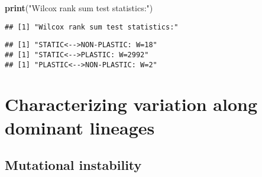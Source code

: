 \documentclass[]{book}
\newenvironment{Shaded}{\begin{snugshade}}{\end{snugshade}}
\newcommand{\ControlFlowTok}[1]{\textcolor[rgb]{0.13,0.29,0.53}{\textbf{#1}}}
\newcommand{\DataTypeTok}[1]{\textcolor[rgb]{0.13,0.29,0.53}{#1}}
\newcommand{\DecValTok}[1]{\textcolor[rgb]{0.00,0.00,0.81}{#1}}
\newcommand{\KeywordTok}[1]{\textcolor[rgb]{0.13,0.29,0.53}{\textbf{#1}}}
\newcommand{\NormalTok}[1]{#1}
\newcommand{\OperatorTok}[1]{\textcolor[rgb]{0.81,0.36,0.00}{\textbf{#1}}}
\newcommand{\OtherTok}[1]{\textcolor[rgb]{0.56,0.35,0.01}{#1}}
\newcommand{\StringTok}[1]{\textcolor[rgb]{0.31,0.60,0.02}{#1}}
\begin{document}
\begin{Shaded}
\begin{Highlighting}[]
\KeywordTok{print}\NormalTok{(}\StringTok{"Wilcox rank sum test statistics:"}\NormalTok{)}
\end{Highlighting}
\end{Shaded}

\begin{verbatim}
## [1] "Wilcox rank sum test statistics:"
\end{verbatim}

\begin{Shaded}
\end{Shaded}

\begin{verbatim}
## [1] "STATIC<-->NON-PLASTIC: W=18"
## [1] "STATIC<-->PLASTIC: W=2992"
## [1] "PLASTIC<-->NON-PLASTIC: W=2"
\end{verbatim}

\hypertarget{characterizing-variation-along-dominant-lineages}{%
\section{Characterizing variation along dominant lineages}\label{characterizing-variation-along-dominant-lineages}}

\hypertarget{mutational-instability}{%
\subsection{Mutational instability}\label{mutational-instability}}
\end{document}
